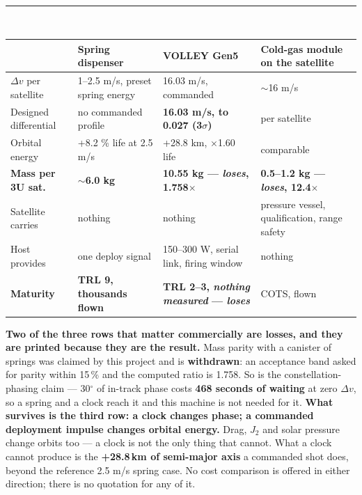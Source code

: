 \documentclass[10pt,a4paper]{article}
\newcommand{\hrulethin}{\textcolor{rule}{\rule{\linewidth}{0.4pt}}}
\newcommand{\shead}[1]{\vspace{1.6mm}{\bfseries\footnotesize\textcolor{ox}{\MakeUppercase{#1}}}\\[0.5mm]\hrulethin\\[1.1mm]}
\begin{document}
\vspace{2.2mm}
\shead{The honest comparison}
{\scriptsize
\begin{tabular}{@{}L{27mm}@{\hspace{3mm}}L{33mm}@{\hspace{3mm}}L{\dimexpr\linewidth-123mm\relax}@{\hspace{3mm}}L{54mm}@{}}
\toprule
 & \textbf{Spring dispenser} & \textcolor{ox}{\textbf{VOLLEY Gen5}} & \textbf{Cold-gas module on the satellite}\\
\midrule
$\Delta v$ per satellite & 1--2.5 m/s, preset spring energy & \textcolor{ox}{16.03 m/s, commanded} & $\sim$16 m/s\\
Designed differential & no commanded profile & \textcolor{ox}{\textbf{16.03 m/s, to 0.027 (3$\sigma$)}} & per satellite\\
Orbital energy & +8.2 \% life at 2.5 m/s & \textcolor{ox}{+28.8 km, $\times$1.60 life} & comparable\\
\textbf{Mass per 3U sat.} & \textbf{$\sim$6.0 kg} & \textbf{10.55 kg --- \emph{loses}, 1.758$\times$} & \textbf{0.5--1.2 kg --- \emph{loses}, 12.4$\times$}\\
Satellite carries & nothing & nothing & pressure vessel, qualification, range safety\\
Host provides & one deploy signal & 150--300 W, serial link, firing window & nothing\\
\textbf{Maturity} & \textbf{TRL 9, thousands flown} & \textbf{TRL 2--3, \emph{nothing measured} --- \emph{loses}}& COTS, flown\\
\bottomrule
\end{tabular}\par}
\vspace{1.0mm}
{\scriptsize\textcolor{soft}{\textbf{Two of the three rows that matter commercially are losses, and
they are printed because they are the result.} Mass parity with a canister of springs was claimed
by this project and is \textbf{withdrawn}: an acceptance band asked for parity within 15\,\% and
the computed ratio is 1.758. So is the constellation-phasing claim --- 30$^\circ$ of in-track phase
costs \textbf{468 seconds of waiting} at zero $\Delta v$, so a spring and a clock reach it and this
machine is not needed for it. \textbf{What survives is the third row: a clock changes phase; a commanded
deployment impulse changes orbital energy.} Drag, $J_2$ and solar pressure change orbits too --- a
clock is not the only thing that cannot. What a clock cannot produce is the \textbf{+28.8\,km of
semi-major axis} a commanded shot does, beyond the reference 2.5 m/s spring case. No cost comparison is offered in either direction; there is no
quotation for any of it.}\par}
\end{document}
